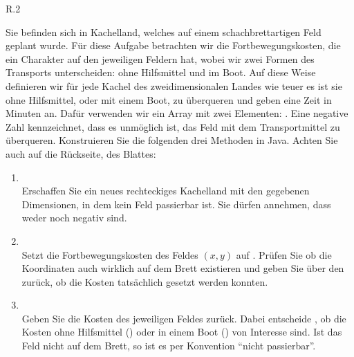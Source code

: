 \documentclass[table]{sopra-base}
\let\say\enquote
\begin{document}
\begin{wrapfigure}[7]{R}{.2\linewidth}
\vspace*{-1.33\topsep}\downsize\linewidth{\begin{tikzpicture}
    \draw[clip] circle [radius=15];
    \draw (-15,-15) grid (15, 15);
\end{tikzpicture}}
\end{wrapfigure}
Sie befinden sich in Kachelland, welches auf einem schachbrettartigen Feld geplant wurde.
Für diese Aufgabe betrachten wir die Fortbewegungskosten, die ein Charakter auf den jeweiligen Feldern hat, wobei wir zwei Formen des Transports unterscheiden: ohne Hilfsmittel und im Boot.
Auf diese Weise definieren wir für jede Kachel des zweidimensionalen Landes wie teuer es ist sie ohne Hilfsmittel, oder mit einem Boot, zu überqueren und geben eine Zeit in Minuten an.
Dafür verwenden wir ein Array mit zwei Elementen: .
Eine negative Zahl kennzeichnet, dass es unmöglich ist, das Feld mit dem Transportmittel zu überqueren.
Konstruieren Sie die folgenden drei Methoden in Java. Achten Sie auch auf die Rückseite, des Blattes: \begin{enumerate}
    \item {}\\
        Erschaffen Sie ein neues rechteckiges Kachelland mit den gegebenen Dimensionen, in dem kein Feld passierbar ist. Sie dürfen annehmen, dass weder  noch  negativ sind.
    \item {}\\
        Setzt die Fortbewegungskosten des Feldes \((x, y)\) auf .
        Prüfen Sie ob die Koordinaten auch wirklich auf dem Brett existieren und geben Sie über den  zurück, ob die Kosten tatsächlich gesetzt werden konnten.
    \item {}\\
        Geben Sie die Kosten des jeweiligen Feldes zurück. Dabei entscheide , ob die Kosten ohne Hilfsmittel () oder in einem Boot () von Interesse sind.
        Ist das Feld nicht auf dem Brett, so ist es per Konvention \say{nicht passierbar}.
\end{enumerate}
\end{document}
